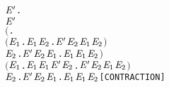 \begin{alltt}
  \HOLTokenDefEquality{}
  \HOLSymConst{\HOLTokenForall{}} \ensuremath{\HOLBoundVar{E}\sp{\prime}}.
        \ensuremath{\HOLBoundVar{E}\sp{\prime}} \HOLSymConst{\HOLTokenImp{}}
      \ensuremath{(}\HOLSymConst{\HOLTokenForall{}}.
           \ensuremath{(}\HOLSymConst{\HOLTokenForall{}}\ensuremath{\HOLBoundVar{E}\sb{\mathrm{1}}}.  \HOLTokenTransBegin{} \HOLTokenTransEnd \ensuremath{\HOLBoundVar{E}\sb{\mathrm{1}}} \HOLSymConst{\HOLTokenImp{}} \HOLSymConst{\HOLTokenExists{}}\ensuremath{\HOLBoundVar{E}\sb{\mathrm{2}}}. \ensuremath{\HOLBoundVar{E}\sp{\prime}} \HOLTokenTransBegin{} \HOLTokenTransEnd \ensuremath{\HOLBoundVar{E}\sb{\mathrm{2}}} \HOLSymConst{\HOLTokenConj{}}  \ensuremath{\HOLBoundVar{E}\sb{\mathrm{1}}} \ensuremath{\HOLBoundVar{E}\sb{\mathrm{2}}}\ensuremath{)} \HOLSymConst{\HOLTokenConj{}}
           \HOLSymConst{\HOLTokenForall{}}\ensuremath{\HOLBoundVar{E}\sb{\mathrm{2}}}. \ensuremath{\HOLBoundVar{E}\sp{\prime}} \HOLTokenTransBegin{} \HOLTokenTransEnd \ensuremath{\HOLBoundVar{E}\sb{\mathrm{2}}} \HOLSymConst{\HOLTokenImp{}} \HOLSymConst{\HOLTokenExists{}}\ensuremath{\HOLBoundVar{E}\sb{\mathrm{1}}}.  \HOLTokenWeakTransBegin{} \HOLTokenWeakTransEnd \ensuremath{\HOLBoundVar{E}\sb{\mathrm{1}}} \HOLSymConst{\HOLTokenConj{}} \ensuremath{\HOLBoundVar{E}\sb{\mathrm{1}}} \HOLSymConst{\HOLTokenWeakEQ} \ensuremath{\HOLBoundVar{E}\sb{\mathrm{2}}}\ensuremath{)} \HOLSymConst{\HOLTokenConj{}}
      \ensuremath{(}\HOLSymConst{\HOLTokenForall{}}\ensuremath{\HOLBoundVar{E}\sb{\mathrm{1}}}.  \HOLTokenTransBegin\HOLSymConst{\ensuremath{\tau}}\HOLTokenTransEnd \ensuremath{\HOLBoundVar{E}\sb{\mathrm{1}}} \HOLSymConst{\HOLTokenImp{}}  \ensuremath{\HOLBoundVar{E}\sb{\mathrm{1}}} \ensuremath{\HOLBoundVar{E}\sp{\prime}} \HOLSymConst{\HOLTokenDisj{}} \HOLSymConst{\HOLTokenExists{}}\ensuremath{\HOLBoundVar{E}\sb{\mathrm{2}}}. \ensuremath{\HOLBoundVar{E}\sp{\prime}} \HOLTokenTransBegin\HOLSymConst{\ensuremath{\tau}}\HOLTokenTransEnd \ensuremath{\HOLBoundVar{E}\sb{\mathrm{2}}} \HOLSymConst{\HOLTokenConj{}}  \ensuremath{\HOLBoundVar{E}\sb{\mathrm{1}}} \ensuremath{\HOLBoundVar{E}\sb{\mathrm{2}}}\ensuremath{)} \HOLSymConst{\HOLTokenConj{}}
      \HOLSymConst{\HOLTokenForall{}}\ensuremath{\HOLBoundVar{E}\sb{\mathrm{2}}}. \ensuremath{\HOLBoundVar{E}\sp{\prime}} \HOLTokenTransBegin\HOLSymConst{\ensuremath{\tau}}\HOLTokenTransEnd \ensuremath{\HOLBoundVar{E}\sb{\mathrm{2}}} \HOLSymConst{\HOLTokenImp{}} \HOLSymConst{\HOLTokenExists{}}\ensuremath{\HOLBoundVar{E}\sb{\mathrm{1}}}.  \HOLSymConst{\HOLTokenEPS} \ensuremath{\HOLBoundVar{E}\sb{\mathrm{1}}} \HOLSymConst{\HOLTokenConj{}} \ensuremath{\HOLBoundVar{E}\sb{\mathrm{1}}} \HOLSymConst{\HOLTokenWeakEQ} \ensuremath{\HOLBoundVar{E}\sb{\mathrm{2}}}\hfill{[CONTRACTION]}


\end{alltt}
